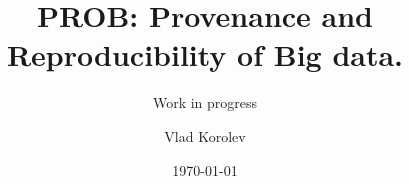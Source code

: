 \documentclass{beamer}
\title{PROB: Provenance and Reproducibility  of Big data.}
\subtitle{Work in progress}
\author{Vlad Korolev}
\date[]{ \today}
\begin{document}
{
\begin{frame}
  \titlepage
\end{frame}
}



\end{document}
